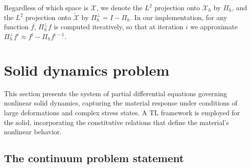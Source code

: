 \documentclass[11pt,english]{article}
\begin{document}
Regardless of which space is $\mathcal{X}$, we denote the $L^2$ projection onto $\mathcal{X}_h$ by $\Pi_h$, and the $L^2$ projection onto $\tilde{\mathcal{X}}$ by $\Pi_h^\bot = I - \Pi_h$. In our implementation, for any function $f$,  $\Pi_h^\bot f$ is computed iteratively, so that at iteration $i$ we approximate $\Pi_h^\bot f^i \approx f^i - \Pi_h f^{i-1}$. 

%
%

\section{Solid dynamics problem \label{sec:solid_dynamics_problem}}

This section presents the system of partial differential equations governing nonlinear solid dynamics, capturing the material response under conditions of large deformations and complex stress states. A TL framework is employed for the solid, incorporating the constitutive relations that define the material’s nonlinear behavior.

\subsection{The continuum problem statement\label{subsec:solid_continuum}}

\end{document}
